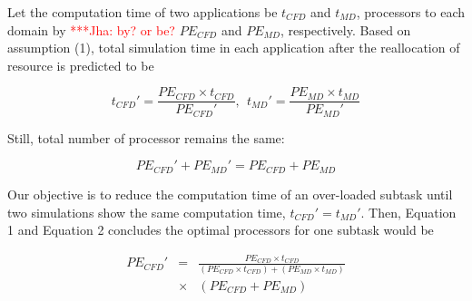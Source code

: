 \documentclass[conference,final]{IEEEtran}
\newcommand{\jhanote}[1]{ {\textcolor{red} { ***Jha: #1 }}}
\newcommand{\jhanote}[1]{}
\begin{document}



Let the computation time of two applications be $t_{CFD}$ and $t_{MD}$, processors to each domain by \jhanote{by? or be?} $PE_{CFD}$ and $PE_{MD}$, respectively. Based on assumption (1), total simulation time in each application after the reallocation of resource is predicted to be

\begin{equation}
t_{CFD}' = \frac {PE_{CFD} \times t_{CFD}} {PE_{CFD}'} , ~~ t_{MD}' = \frac {PE_{MD} \times t_{MD}} {PE_{MD}'}
\end{equation}

Still, total number of processor remains the same:

\begin{equation}
PE_{CFD}' + PE_{MD}' = PE_{CFD} + PE_{MD}
\end{equation}

Our objective is to reduce the computation time of an over-loaded subtask until two simulations show the same computation time, $t_{CFD}' = t_{MD}'$. Then, Equation 1 and Equation 2 concludes the optimal processors for one subtask would be

\begin{eqnarray}
PE_{CFD}' & = & \frac {PE_{CFD} \times t_{CFD}} {(PE_{CFD} \times t_{CFD}) + (PE_{MD} \times t_{MD})} \\
& \times & {(PE_{CFD} + PE_{MD})}
\end{eqnarray}
\end{document}
